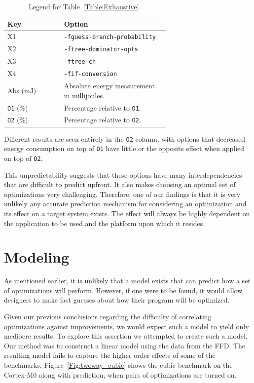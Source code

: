 \documentclass[twocolumn]{article}
\let\oldcaption\caption
\renewcommand{\caption}[1]{\oldcaption{\textup{#1}}}
\begin{document}
\begin{table}[thb]
	\centering
	\begin{tabular}{l p{0.65\linewidth}}
		\bfseries Key & \bfseries Option \\
		\hline
		X1 & \texttt{-fguess-branch-probability}  \\
		X2 & \texttt{-ftree-dominator-opts}  \\
		X3 & \texttt{-ftree-ch} \\
		X4 & \texttt{-fif-conversion} \\
		Abs (mJ) & Absolute energy measurement in millijoules. \\
		\texttt{O1} (\%) & Percentage relative to \texttt{O1}. \\
		\texttt{O2} (\%) & Percentage relative to \texttt{O2}. \\
	\end{tabular}
	\caption{Legend for Table~\ref{Table:Exhaustive}.}
	\label{Table:ExhaustiveLegend}
\end{table}


Different results are seen entirely in the \texttt{O2} column, with options that decreased energy consumption on top of \texttt{O1} have little or the opposite effect when applied on top of \texttt{O2}.

This unpredictability suggests that these options have many interdependencies that are difficult to predict upfront. It also makes choosing an optimal set of optimizations very challenging. Therefore, one of our findings is that it is very unlikely any accurate prediction mechanism for considering an optimization and its effect on a target system exists. The effect will always be highly dependent on the application to be used and the platform upon which it resides.

\section{Modeling}

As mentioned earlier, it is unlikely that a model exists that can predict how a set of optimizations will perform. However, if one were to be found, it would allow designers to make fast guesses about how their program will be optimized.

Given our previous conclusions regarding the difficulty of correlating optimizations against improvements, we would expect such a model to yield only mediocre results. To explore this assertion we attempted to create such a model. Our method was to construct a linear model using the data from the FFD. The resulting model fails to capture the higher order effects of some of the benchmarks. Figure~\ref{Fig:twoway_cubic} shows the cubic benchmark on the Cortex-M0 along with prediction, when pairs of optimizations are turned on.
\end{document}
